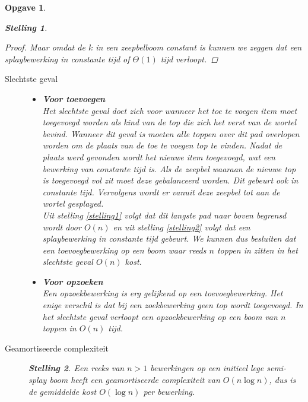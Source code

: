 \documentclass[12pt,hidelinks]{article}
\newtheorem{opgave}{Opgave}
\newtheorem{stelling}{Stelling}
\begin{document}
\begin{opgave}
\begin{stelling}
\begin{proof}
                Maar omdat de $k$ in een zeepbelboom constant is kunnen we zeggen dat een splaybewerking in constante tijd of $\Theta(1)$ tijd verloopt.
            \end{proof}
        \end{stelling}
        \begin{description}
            \item[Slechtste geval]
                \hfill
                \begin{itemize}
                    \item \textbf{Voor toevoegen}\\
                        Het slechtste geval doet zich voor wanneer het toe te voegen item moet toegevoegd worden als kind van de top die zich het verst van de wortel bevind. 
                        Wanneer dit geval is moeten alle toppen over dit pad overlopen worden om de plaats van de toe te voegen top te vinden.
                        Nadat de plaats werd gevonden wordt het nieuwe item toegevoegd, wat een bewerking van constante tijd is.
                        Als de zeepbel waaraan de nieuwe top is toegevoegd vol zit moet deze gebalanceerd worden. Dit gebeurt ook in constante tijd.
                        Vervolgens wordt er vanuit deze zeepbel tot aan de wortel gesplayed.
                        \\
                        Uit stelling \ref{stelling1} volgt dat dit langste pad naar boven begrensd wordt door $O(n)$ en uit stelling \ref{stelling2} volgt dat een splaybewerking in constante tijd gebeurt.
                        We kunnen dus besluiten dat een toevoegbewerking op een boom waar reeds $n$ toppen in zitten in het slechtste geval $O(n)$ kost.
                    \item \textbf{Voor opzoeken}\\
                        Een opzoekbewerking is erg gelijkend op een toevoegbewerking. 
                        Het enige verschil is dat bij een zoekbewerking geen top wordt toegevoegd.
                        In het slechtste geval verloopt een opzoekbewerking op een boom van $n$ toppen in $O(n)$ tijd.
                \end{itemize}
            \item[Geamortiseerde complexiteit]
                \hfill
                \begin{stelling}
                    Een reeks van $n > 1$ bewerkingen op een initieel lege semi-splay boom heeft een geamortiseerde complexiteit van $O(n \log n)$, dus is de gemiddelde kost $O(\log n)$ per bewerking.

\end{stelling}
\end{description}
\end{opgave}
\end{document}
